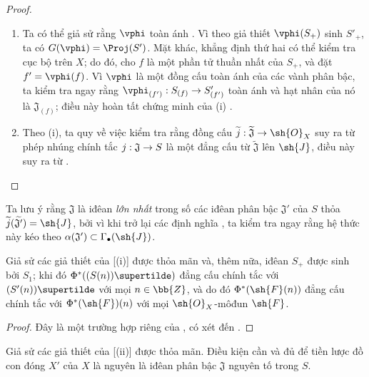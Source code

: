 \documentclass[oneside,10pt]{amsart}
\makeatletter
\newcommand{\ega@arrow}[2]{\mathchoice{#1}{#2}{#2}{#2}}
\renewcommand{\to}{\ega@arrow{\longrightarrow}{\rightarrow}}
\newcommand{\oldpage}[2][]{\marginnote{\normalfont\footnotesize\textbf{#1}~|~#2}\ignorespaces}
\let\EGAOriginalLabel\label
\renewcommand{\label}[1]{\phantomsection\EGAOriginalLabel{#1}}
\makeatother
\begin{document}
\begin{proof}
\medskip\noindent
\begin{enumerate}
  \item[{\rm(i)}] Ta có thể giả sử rằng $\vphi$ toàn ánh .
    Vì theo giả thiết $\vphi(S_+)$ sinh $S'_+$, ta có $G(\vphi)=\Proj(S')$.
    Mặt khác, khẳng định thứ hai có thể kiểm tra cục bộ trên $X$;
    do đó, cho $f$ là một phần tử thuần nhất của $S_+$, và đặt $f'=\vphi(f)$.
    Vì $\vphi$ là một đồng cấu toàn ánh của các vành phân bậc, ta kiểm tra ngay rằng $\vphi_{(f')}:S_{(f)}\to S'_{(f')}$ toàn ánh và hạt nhân của nó là $\mathfrak{J}_{(f)}$; điều này hoàn tất chứng minh của (i) .
  \item[{\rm(ii)}] Theo (i), ta quy về việc kiểm tra rằng đồng cấu $\widetilde{j}:\widetilde{\mathfrak{J}}\to\sh{O}_X$ suy ra từ phép nhúng chính tắc $j:\mathfrak{J}\to S$ là một đẳng cấu từ $\widetilde{\mathfrak{J}}$ lên $\sh{J}$, điều này suy ra từ .
\end{enumerate}
\end{proof}

Ta lưu ý rằng $\mathfrak{J}$ là iđêan \emph{lớn nhất} trong số các iđêan phân bậc $\mathfrak{J}'$ của $S$ thỏa $\widetilde{j}(\widetilde{\mathfrak{J'}})=\sh{J}$, bởi vì khi trở lại các định nghĩa , ta kiểm tra ngay rằng hệ thức này kéo theo $\alpha(\mathfrak{J}')\subset\Gamma_\bullet(\sh{J})$.

\begin{corollary}[2.9.3]
\label{II.2.9.3}
Giả sử các giả thiết của [(i)] được thỏa mãn và, thêm nữa, iđêan $S_+$ được sinh bởi $S_1$;
khi đó $\Phi^*((S(n))\supertilde)$ đẳng cấu chính tắc với $(S'(n))\supertilde$ với mọi $n\in\bb{Z}$, và do đó $\Phi^*(\sh{F}(n))$ đẳng cấu chính tắc với $\Phi^*(\sh{F})(n)$ với mọi $\sh{O}_X$-môđun $\sh{F}$.
\end{corollary}

\begin{proof}
Đây là một trường hợp riêng của , có xét đến .
\end{proof}

\begin{corollary}[2.9.4]
\label{II.2.9.4}
Giả sử các giả thiết của [(ii)] được thỏa mãn.
Điều kiện cần và đủ để tiền lược đồ con đóng $X'$ của $X$ là nguyên là iđêan phân bậc $\mathfrak{J}$ nguyên tố trong $S$.
\end{corollary}
\oldpage[II]{49}
\end{document}
